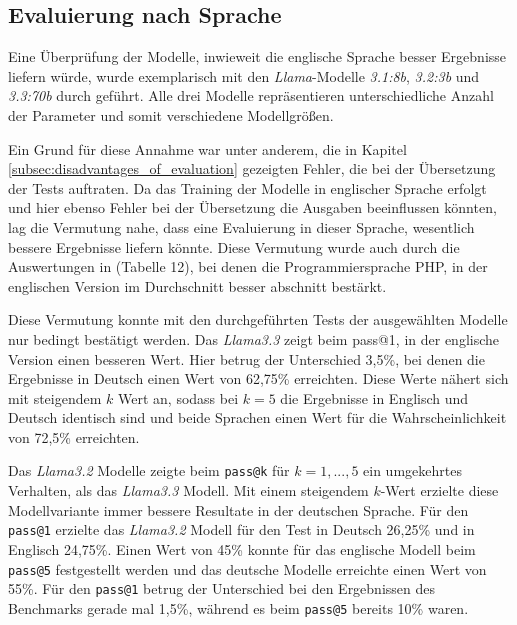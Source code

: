 \subsection{Evaluierung nach Sprache}
Eine Überprüfung der Modelle, inwieweit die englische Sprache besser Ergebnisse liefern würde, wurde exemplarisch mit den \textit{Llama}-Modelle \textit{3.1:8b}, \textit{3.2:3b} und \textit{3.3:70b} durch geführt. Alle drei Modelle repräsentieren unterschiedliche Anzahl der Parameter und somit verschiedene Modellgrößen.\vspace{0.2cm}

Ein Grund für diese Annahme war unter anderem, die in Kapitel \ref{subsec:disadvantages_of_evaluation} gezeigten Fehler, die bei der Übersetzung der Tests auftraten. Da das Training der Modelle in englischer Sprache erfolgt und hier ebenso Fehler bei der Übersetzung die Ausgaben beeinflussen könnten, lag die Vermutung nahe, dass eine Evaluierung in dieser Sprache, wesentlich bessere Ergebnisse liefern könnte. Diese Vermutung wurde auch durch die Auswertungen in \cite[][11]{peng-2024} (Tabelle 12), bei denen die Programmiersprache PHP, in der englischen Version im Durchschnitt besser abschnitt bestärkt.\vspace{0.2cm}

Diese Vermutung konnte mit den durchgeführten Tests der ausgewählten Modelle nur bedingt bestätigt werden. Das \textit{Llama3.3} zeigt beim pass@1, in der englische Version einen besseren Wert. Hier betrug der Unterschied 3,5\%, bei denen die Ergebnisse in Deutsch einen Wert von 62,75\% erreichten. Diese Werte nähert sich mit steigendem $k$ Wert an, sodass bei $k=5$ die Ergebnisse in Englisch und Deutsch identisch sind und beide Sprachen einen Wert für die Wahrscheinlichkeit von 72,5\% erreichten.\vspace{0.2cm}

Das \textit{Llama3.2} Modelle zeigte beim \texttt{pass@k} für $k=1,...,5$ ein umgekehrtes Verhalten, als das \textit{Llama3.3} Modell. Mit einem steigendem $k$-Wert erzielte diese Modellvariante immer bessere Resultate in der deutschen Sprache. Für  den \texttt{pass@1} erzielte das \textit{Llama3.2} Modell für den Test in Deutsch 26,25\% und in Englisch 24,75\%. Einen Wert von 45\% konnte für das englische Modell beim \texttt{pass@5} festgestellt werden und das deutsche Modelle erreichte einen Wert von 55\%. Für den \texttt{pass@1} betrug der Unterschied bei den Ergebnissen des Benchmarks gerade mal 1,5\%, während es beim \texttt{pass@5} bereits 10\% waren.\vspace{0.2cm}

